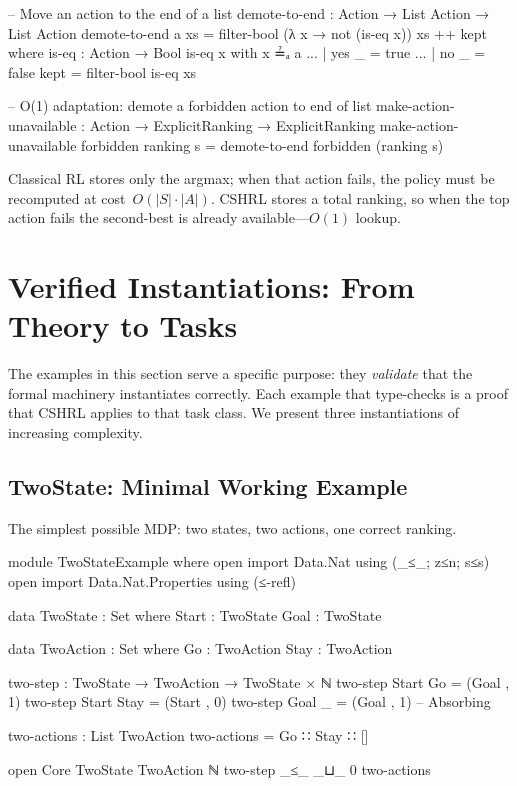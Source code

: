 \documentclass[9pt,a4paper]{article}
\theoremstyle{plain}
\theoremstyle{definition}
\theoremstyle{remark}
\begin{document}
\begin{code}[hide]
  -- Move an action to the end of a list
  demote-to-end : Action → List Action → List Action
  demote-to-end a xs = filter-bool (λ x → not (is-eq x)) xs ++ kept
    where
      is-eq : Action → Bool
      is-eq x with x ≟ₐ a
      ... | yes _ = true
      ... | no  _ = false
      kept = filter-bool is-eq xs
\end{code}

\begin{code}
  -- O(1) adaptation: demote a forbidden action to end of list
  make-action-unavailable : Action → ExplicitRanking → ExplicitRanking
  make-action-unavailable forbidden ranking s = demote-to-end forbidden (ranking s)
\end{code}

\noindent Classical RL stores only the argmax; when that action fails, the policy must be recomputed at cost~$O(|S| \cdot |A|)$.  CSHRL stores a total ranking, so when the top action fails the second-best is already available---$O(1)$ lookup.

\section{Verified Instantiations: From Theory to Tasks}

The examples in this section serve a specific purpose: they \emph{validate} that the formal machinery instantiates correctly. Each example that type-checks is a proof that CSHRL applies to that task class. We present three instantiations of increasing complexity.

\subsection{TwoState: Minimal Working Example}

The simplest possible MDP: two states, two actions, one correct ranking.

\begin{code}
module TwoStateExample where
  open import Data.Nat using (_≤_; z≤n; s≤s)
  open import Data.Nat.Properties using (≤-refl)

  data TwoState : Set where
    Start : TwoState
    Goal  : TwoState

  data TwoAction : Set where
    Go   : TwoAction
    Stay : TwoAction

  two-step : TwoState → TwoAction → TwoState × ℕ
  two-step Start Go   = (Goal , 1)
  two-step Start Stay = (Start , 0)
  two-step Goal  _    = (Goal , 1)  -- Absorbing

  two-actions : List TwoAction
  two-actions = Go ∷ Stay ∷ []

  open Core TwoState TwoAction ℕ two-step _≤_ _⊔_ 0 two-actions
\end{code}
\end{document}
